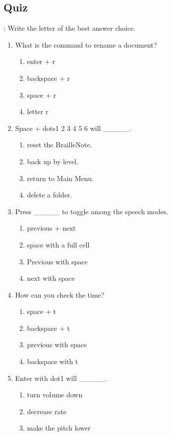 \documentclass[10pt,letterpaper,twoside]{report}
\begin{document}
\subsection{Quiz}:
Write the letter of the best answer choice.
\begin{enumerate}
	\item What is the command to rename a document?
	      \begin{enumerate}
		      \item enter + r
		      \item backspace + r
		      \item space + r
		      \item letter r
	      \end{enumerate}
	\item Space + dots1 2 3 4 5 6 will \_\_\_\_\_.
	      \begin{enumerate}
		      \item reset the BrailleNote.
		      \item back up by level.
		      \item return to Main Menu.
		      \item delete a folder.
	      \end{enumerate}
	\item Press \_\_\_\_\_ to toggle among the speech modes.
	      \begin{enumerate}
		      \item previous + next
		      \item space with a full cell
		      \item Previous with space
		      \item next with space
	      \end{enumerate}
	\item How can you check the time?
	      \begin{enumerate}
		      \item space + t
		      \item backspace + t
		      \item previous with space
		      \item backspace with t
	      \end{enumerate}
	\item Enter with dot1 will \_\_\_\_\_.
	      \begin{enumerate}
		      \item turn volume down
		      \item decrease rate
		      \item make the pitch lower

\end{enumerate}
\end{enumerate}
\end{document}
